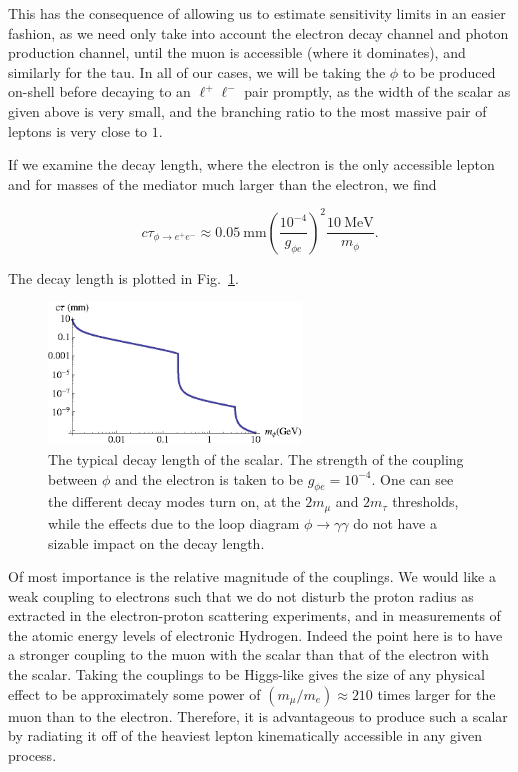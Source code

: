 This has the consequence of allowing us to estimate sensitivity limits in an easier fashion, as we need only take into account the electron decay channel and photon production channel, until the muon is accessible (where it dominates), and similarly for the tau.
In all of our cases, we will be taking the $\phi$ to be produced on-shell before decaying to an $\ell^+ \ell^-$ pair promptly, as the width of the scalar as given above is very small, and the branching ratio to the most massive pair of leptons is very close to $1$.

If we examine the decay length, where the electron is the only accessible lepton and for masses of the mediator much larger than the electron, we find

\begin{equation}
    c \tau_{\phi \rightarrow e^+ e^-} \approx 0.05~\textrm{mm} \left(\frac{10^{-4}}{g_{\phi e}}\right)^2 \frac{10~\textrm{MeV}}{m_\phi}\textrm{.}
\end{equation}

\noindent The decay length is plotted in Fig.\ \ref{fig:ctau_phi}.

\begin{figure}[h]
    \centering
    \includegraphics[width = 0.6\textwidth]{Figures/misc/ctau_phi}
    \caption[The typical decay length of the scalar.]{The typical decay length of the scalar. The strength of the coupling between $\phi$ and the electron is taken to be $g_{\phi e} = 10^{-4}$. One can see the different decay modes turn on, at the $2 m_\mu$ and $2 m_\tau$ thresholds, while the effects due to the loop diagram $\phi \rightarrow \gamma \gamma$ do not have a sizable impact on the decay length.}
    \label{fig:ctau_phi}
\end{figure}

Of most importance is the relative magnitude of the couplings.
We would like a weak coupling to electrons such that we do not disturb the proton radius as extracted in the electron-proton scattering experiments, and in measurements of the atomic energy levels of electronic Hydrogen.
Indeed the point here is to have a stronger coupling to the muon with the scalar than that of the electron with the scalar.
Taking the couplings to be Higgs-like gives the size of any physical effect to be approximately some power of $(m_\mu/m_e) \approx 210$ times larger for the muon than to the electron.
Therefore, it is advantageous to produce such a scalar by radiating it off of the heaviest lepton kinematically accessible in any given process.

